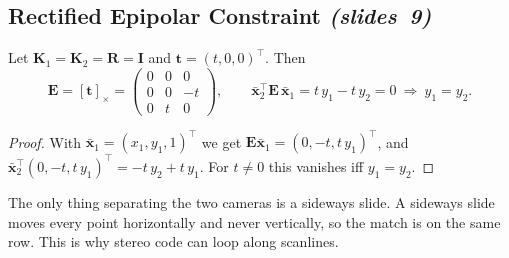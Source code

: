 \documentclass[11pt,a4paper]{article}
\newcommand{\slr}[1]{\texorpdfstring{\emph{(slides~#1)}}{(slides #1)}}
\newcommand{\vt}{\bm{t}}
\newcommand{\xb}{\bar{\bm{x}}}
\newcommand{\E}{\bm{E}}
\newcommand{\R}{\bm{R}}
\newcommand{\K}{\bm{K}}
\theoremstyle{definition}
\begin{document}
\subsection{Rectified Epipolar Constraint \slr{9}}
\begin{Proposition}\label{prop:rect}
Let $\K_1=\K_2=\R=\bm I$ and $\vt=(t,0,0)^{\top}$. Then
\[
\E=[\vt]_\times=\begin{pmatrix}0&0&0\\0&0&-t\\0&t&0\end{pmatrix},\qquad
\xb_2^{\top}\E\,\xb_1=t\,y_1-t\,y_2=0\ \Longrightarrow\ y_1=y_2 .
\]
\end{Proposition}
\begin{proof}
With $\xb_1=(x_1,y_1,1)^{\top}$ we get $\E\xb_1=(0,-t,t\,y_1)^{\top}$, and $\xb_2^{\top}(0,-t,t\,y_1)^{\top}=-t\,y_2+t\,y_1$. For $t\neq0$ this vanishes iff $y_1=y_2$.
\end{proof}
\begin{intuition}
The only thing separating the two cameras is a sideways slide. A sideways slide moves every point horizontally and never vertically, so the match is on the same row. This is why stereo code can loop along scanlines.
\end{intuition}
\end{document}

